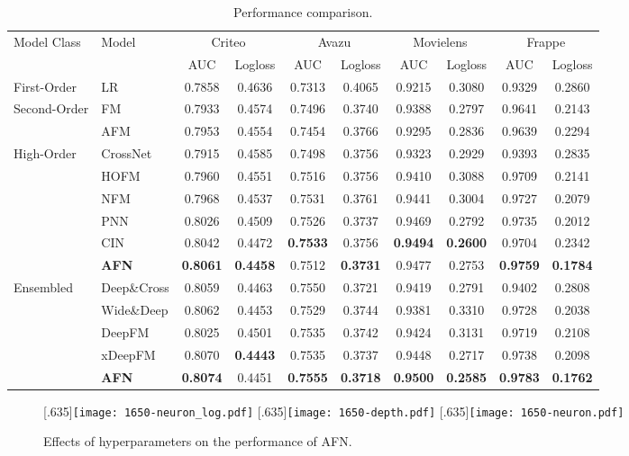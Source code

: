\documentclass[letterpaper]{article} \usepackage{aaai20}  \usepackage{times}  \usepackage{helvet} \usepackage{courier}  \usepackage[hyphens]{url}  \usepackage{graphicx} \urlstyle{rm} \def\UrlFont{\rm}  \usepackage{graphicx}  \frenchspacing  \setlength{\pdfpagewidth}{8.5in}  \setlength{\pdfpageheight}{11in}
\newcommand{\modelns}{{AFN}}
\begin{document}
\begin{table*}[t!]
\small
	\captionsetup{labelfont=bf}
	\centering
		\caption{Performance comparison.}
		\label{tab:performance}
	\begin{tabular}{llcccccccc}
		\toprule[1pt]
\multirow{2}{*}{Model Class}&
\multirow{2}{*}{Model}
		 &\multicolumn{2}{c}{Criteo}&\multicolumn{2}{c}{Avazu}&\multicolumn{2}{c}{Movielens}&\multicolumn{2}{c}{Frappe}\\
		 &&AUC&Logloss&AUC&Logloss&AUC&Logloss&AUC&Logloss\\
		\midrule[0.5pt] 
		 First-Order&LR&0.7858&0.4636&0.7313&0.4065&0.9215&0.3080&0.9329&0.2860\\
		\midrule[0.5pt] 
		\multirow{2}{*}{Second-Order 
}&
FM& 0.7933&0.4574&0.7496&0.3740&0.9388&0.2797&0.9641&0.2143\\ 
&AFM&0.7953&0.4554&0.7454&0.3766&0.9295&0.2836&0.9639&0.2294\\ 
\midrule[0.5pt]
\multirow{6}{*}{High-Order 
}&
CrossNet&0.7915&0.4585&0.7498&0.3756&0.9323&0.2929&0.9393&0.2835\\ 
&HOFM&0.7960&0.4551&0.7516&0.3756&0.9410&0.3088&0.9709&0.2141\\
&NFM&0.7968&0.4537&0.7531&0.3761& 0.9441&0.3004&0.9727&0.2079\\
&PNN&0.8026&0.4509&0.7526&0.3737&0.9469&0.2792&0.9735&0.2012\\
&CIN&0.8042&0.4472&\bf{0.7533}&0.3756&\bf{0.9494}&\bf{0.2600}&0.9704&0.2342\\ 
&\bf{AFN}&\bf{0.8061}&\bf{0.4458}&0.7512&\bf{0.3731}&0.9477&0.2753&\bf{0.9759}&\bf{0.1784}\\
\midrule[0.5pt]
\multirow{6}{*}{Ensembled 
}&
Deep\&Cross&0.8059&0.4463&0.7550&0.3721&0.9419&0.2791&0.9402&0.2808\\
		&Wide\&Deep&0.8062&0.4453&0.7529&0.3744&0.9381&0.3310&0.9728&0.2038\\
		&DeepFM&0.8025&0.4501&0.7535&0.3742&0.9424&0.3131&0.9719&0.2108\\
		&xDeepFM&0.8070&\bf{0.4443}&0.7535&0.3737&0.9448&0.2717&0.9738&0.2098\\ 
		&\bf{AFN}&\bf{0.8074}&0.4451&\bf{0.7555}&\bf{0.3718}&\bf{0.9500}&\bf{0.2585}&\bf{0.9783}&\bf{0.1762}\\
		\bottomrule[1pt]
	\end{tabular}  
\end{table*}

\begin{figure*}
	\centering
	[.635\columnwidth]{\texttt{[image: 1650-neuron\_log.pdf]}}
	[.635\columnwidth]{\texttt{[image: 1650-depth.pdf]}}
	[.635\columnwidth]{\texttt{[image: 1650-neuron.pdf]}}
	\caption{Effects of hyperparameters on the performance of \modelns.}\label{fig:hyper}
\end{figure*}
\end{document}

